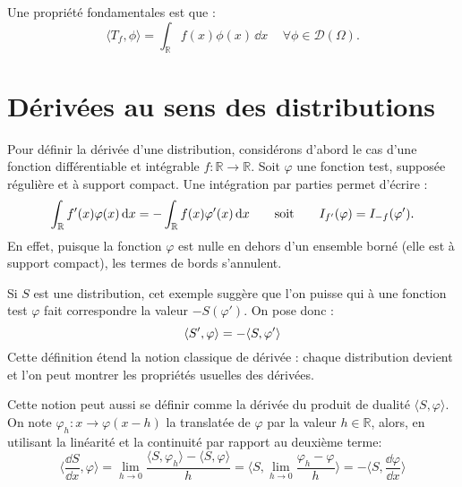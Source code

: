 \medskip
Une propriété fondamentales est que  :
\begin{equation}
    \langle T_f,\phi\rangle=\int_{\mathbb{R}}f(x)\phi(x)\,\dd x \, \quad \forall \phi\in\mathcal{D}(\Omega).
\end{equation}




\medskip
\section{Dérivées au sens des distributions}


\medskip
Pour définir la dérivée d'une distribution, considérons d'abord le cas d'une fonction différentiable
et intégrable $f:\mathbb{R}\rightarrow\mathbb{R}$.
Soit $\varphi$ une fonction test, supposée régulière et à support compact.
Une intégration par parties permet d'écrire :
\begin{equation}
    \int_{\mathbb R} f'(x) \varphi(x)\,\text{d} x = -\int_{\mathbb R} f(x)\varphi'(x)\,\text{d} x \qquad\text{soit}\qquad I_{f'}(\varphi)=I_{-f}(\varphi').
\end{equation}
En effet, puisque la fonction $\varphi$ est nulle en dehors d'un ensemble borné (elle est à support
compact), les termes de bords s'annulent.

\medskip
\begin{definition}
Si $S$ est une distribution, cet exemple suggère que l'on puisse  qui à une fonction test $\varphi$ fait correspondre la valeur $- S(\varphi')$.
On pose donc :
\begin{equation}\colorred
    \langle S', \varphi \rangle = - \langle S, \varphi' \rangle
\end{equation}
Cette définition étend la notion classique de dérivée :
chaque distribution devient  et l'on peut montrer les
propriétés usuelles des dérivées.
\end{definition}

\medskip
Cette notion peut aussi se définir comme la dérivée du produit de dualité $\langle S,\varphi\rangle$.
On note $\varphi_h:x\rightarrow\varphi(x-h)$ la translatée de $\varphi$ par la valeur $h\in{\mathbb R}$,
alors, en utilisant la linéarité et la continuité par rapport au deuxième terme:
\begin{equation}
\langle\frac{\dd S}{\dd x},\varphi\rangle= \lim_{h\rightarrow 0}\frac{ \langle S,\varphi_h\rangle- \langle S,\varphi\rangle}{h}
= \langle S,\lim_{h\rightarrow 0} \frac{\varphi_h-\varphi}{h} \rangle= -\langle S,\frac{\dd\varphi}{\dd x}\rangle
\end{equation}


